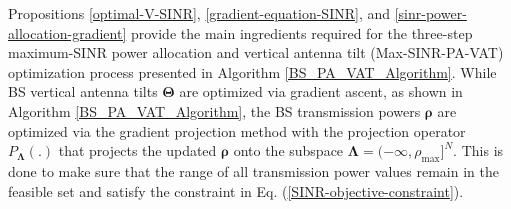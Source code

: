 Propositions \ref{optimal-V-SINR}, \ref{gradient-equation-SINR}, and \ref{sinr-power-allocation-gradient} provide the main ingredients required for the three-step maximum-SINR power allocation and vertical antenna tilt (Max-SINR-PA-VAT)
optimization process presented in Algorithm \ref{BS_PA_VAT_Algorithm}. While BS vertical antenna tilts $\bm{\Theta}$ are optimized via gradient ascent, as shown in Algorithm \ref{BS_PA_VAT_Algorithm}, the BS transmission powers $\bm{\rho}$ are optimized via the gradient projection method with the projection operator $P_{\bm{\Lambda}}(.)$ that projects the updated $\bm{\rho}$ onto the subspace $\bm{\Lambda} = (-\infty, \rho_{\max}]^N$. This is done to make sure that the range of all transmission power values remain in the feasible set and satisfy the constraint in Eq. (\ref{SINR-objective-constraint}).



